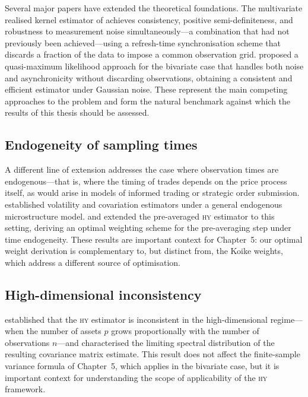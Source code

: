 \documentclass[reqno, 12pt]{amsart}
\newcommand{\HY}{\textsc{hy}}
\theoremstyle{plain}
\theoremstyle{definition}
\theoremstyle{remark}
\begin{document}
Several major papers have extended the theoretical foundations. The
multivariate realised kernel estimator of \citet{barndorff2011}
achieves consistency, positive semi-definiteness, and robustness to
measurement noise simultaneously---a combination that had not
previously been achieved---using a refresh-time synchronisation scheme
that discards a fraction of the data to impose a common observation
grid. \citet{aitsahalia2010} proposed a quasi-maximum likelihood
approach for the bivariate case that handles both noise and
asynchronicity without discarding observations, obtaining a consistent
and efficient estimator under Gaussian noise. These represent the main
competing approaches to the problem and form the natural benchmark
against which the results of this thesis should be assessed.

\subsection{Endogeneity of sampling times}

A different line of extension addresses the case where observation
times are endogenous---that is, where the timing of trades depends on
the price process itself, as would arise in models of informed trading
or strategic order submission. \citet{robert2012} established
volatility and covariation estimators under a general endogenous
microstructure model. \citet{koike2014} and \citet{koike2015}
extended the pre-averaged \HY{} estimator to this setting, deriving
an optimal weighting scheme for the pre-averaging step under time
endogeneity. These results are important context for Chapter~5:
our optimal weight derivation is complementary to, but distinct from,
the Koike weights, which address a different source of optimisation.

\subsection{High-dimensional inconsistency}

\citet{chakrabarti2022} established that the \HY{} estimator is
inconsistent in the high-dimensional regime---when the number of
assets $p$ grows proportionally with the number of observations
$n$---and characterised the limiting spectral distribution of the
resulting covariance matrix estimate. This result does not affect the
finite-sample variance formula of Chapter~5, which applies in the
bivariate case, but it is important context for understanding the
scope of applicability of the \HY{} framework.
\end{document}

